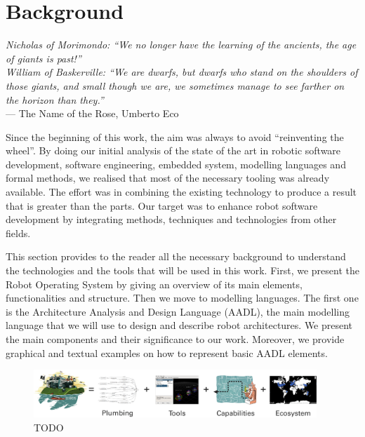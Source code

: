 \chapter[Background]{Background}\label{ch:Background}

\begin{flushright}{\slshape Nicholas of Morimondo: ``We no longer have the learning of the ancients, the age of giants is past!'' \\
William of Baskerville: ``We are dwarfs, but dwarfs who stand on the shoulders of those giants, and small though we are, we sometimes manage to see farther on the horizon than they.''} \\ \medskip
    ---  The Name of the Rose, Umberto Eco
\end{flushright}

Since the beginning of this work, the aim was always to avoid ``reinventing the wheel''. By doing our initial analysis of the state of the art in robotic software development, software engineering, embedded system, modelling languages and formal methods, we realised that most of the necessary tooling was already available. The effort was in combining the existing technology to produce a result that is greater than the parts. Our target was to enhance robot software development by integrating methods, techniques and technologies from other fields.

This section provides to the reader all the necessary background to understand the technologies and the tools that will be used in this work. First, we present the Robot Operating System by giving an overview of its main elements, functionalities and structure. Then we move to modelling languages. The first one is the Architecture Analysis and Design Language (AADL), the main modelling language that we will use to design and describe robot architectures. We present the main components and their significance to our work. Moreover, we provide graphical and textual examples on how to represent basic AADL elements. 

\newpage

\minitoc
\newpage

\begin{figure}[t]
    \centering
    \includegraphics[width=0.95\textwidth]{gfx/ros/ros_equation}
    \caption{TODO}\label{fig:ros}
\end{figure}

